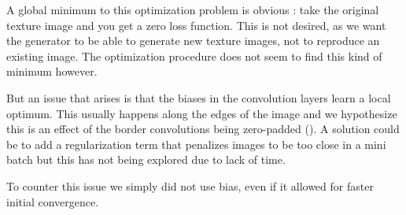 \documentclass{article}
\begin{document}
A global minimum to this optimization problem is obvious : take the original texture image and you get a zero loss function. This is not desired, as we want the generator to be able to generate new texture images, not to reproduce an existing image. The optimization procedure does not seem to find this kind of minimum however.

But an issue that arises is that the biases in the convolution layers learn a local optimum. This usually happens along the edges of the image and we hypothesize this is an effect of the border convolutions being zero-padded (\label{fig:overfit}). A solution could be to add a regularization term that penalizes images to be too close in a mini batch but this has not being explored due to lack of time.

To counter this issue we simply did not use bias, even if it allowed for faster initial convergence.
\end{document}
